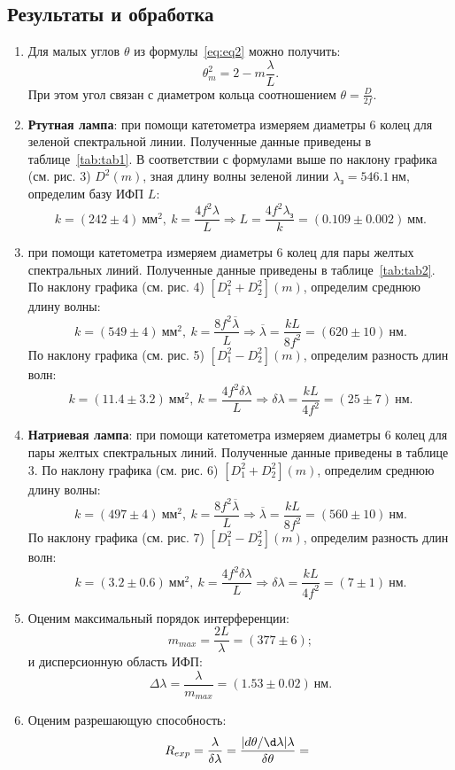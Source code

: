 \documentclass[12pt]{article}
\begin{document}
    \subsection*{Результаты и обработка}
    \begin{enumerate}
        \item Для малых углов $\theta$ из формулы\ \eqref{eq:eq2} можно получить:
        \[\theta_m^2 = 2 - m \frac{\lambda}{L}.\]
        При этом угол связан с диаметром кольца соотношением $\theta = \frac{D}{2f}$.

        \item \textbf{Ртутная лампа}: при помощи катетометра измеряем
        диаметры 6 колец для зеленой спектральной линии.
        Полученные данные приведены в таблице\ \ref{tab:tab1}.
        В соответствии с формулами выше по наклону графика (см. рис. 3) $D^2(m)$,
        зная длину волны зеленой линии $\lambda_{\text{з}} = 546.1\ \text{нм}$,
        определим базу ИФП $L$:
        \[k = (242\pm4)\ \text{мм}^2,\ k = \frac{4f^2\lambda}{L}
        \Rightarrow L = \frac{4f^2\lambda_{\text{з}}}{k} = (0.109 \pm 0.002)\ \text{мм}.\]

        \item при помощи катетометра измеряем
        диаметры 6 колец для пары желтых спектральных линий.
        Полученные данные приведены в таблице\ \ref{tab:tab2}.
        По наклону графика (см. рис. 4) $[D_1^2 + D^2_2](m)$, определим среднюю длину волны:
        \[k = (549 \pm 4)\ \text{мм}^2,\ k = \frac{8f^2 \overline{\lambda}}{L}
        \Rightarrow \overline{\lambda} = \frac{kL}{8f^2} = (620 \pm 10)\ \text{нм}.\]
        По наклону графика (см. рис. 5) $[D_1^2 - D^2_2](m)$, определим разность длин волн:
        \[k = (11.4 \pm 3.2)\ \text{мм}^2,\ k = \frac{4f^2 \delta \lambda}{L}
        \Rightarrow \delta \lambda = \frac{kL}{4f^2} = (25 \pm 7)\ \text{нм}.\]

        \item \textbf{Натриевая лампа}: при помощи катетометра измеряем
        диаметры 6 колец для пары желтых спектральных линий.
        Полученные данные приведены в таблице 3.
        По наклону графика (см. рис. 6) $[D_1^2 + D^2_2](m)$, определим среднюю длину волны:
        \[k = (497 \pm 4)\ \text{мм}^2,\ k = \frac{8f^2 \overline{\lambda}}{L}
        \Rightarrow \overline{\lambda} = \frac{kL}{8f^2} = (560 \pm 10)\ \text{нм}.\]
        По наклону графика (см. рис. 7) $[D_1^2 - D^2_2](m)$, определим разность длин волн:
        \[k = (3.2 \pm 0.6)\ \text{мм}^2,\ k = \frac{4f^2 \delta \lambda}{L}
        \Rightarrow \delta \lambda = \frac{kL}{4f^2} = (7 \pm 1)\ \text{нм}.\]

        \item Оценим максимальный порядок интерференции:
        \[m_{max} = \frac{2L}{\lambda} = (377 \pm 6);\]
        и дисперсионную область ИФП:
        \[\Delta \lambda = \frac{\lambda}{m_{max}} = (1.53 \pm 0.02)\ \text{нм}.\]

        \item Оценим разрешающую способность:
        \[R_{exp} = \frac{\lambda}{\delta \lambda} = \frac{|d\theta/\d\lambda| \lambda}{\delta \theta} = \frac{}{}\]
    \end{enumerate}
\end{document}
